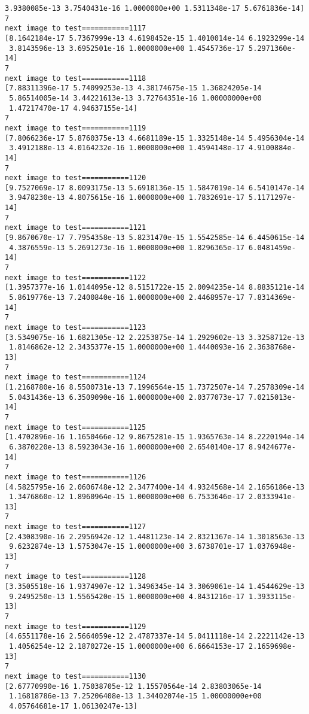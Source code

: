 \documentclass[11pt]{article}
\begin{document}
\begin{Verbatim}[commandchars=\\\{\}]
 3.9380085e-13 3.7540431e-16 1.0000000e+00 1.5311348e-17 5.6761836e-14]
7
next image to test===========1117
[8.1642184e-17 5.7367999e-13 4.6198452e-15 1.4010014e-14 6.1923299e-14
 3.8143596e-13 3.6952501e-16 1.0000000e+00 1.4545736e-17 5.2971360e-14]
7
next image to test===========1118
[7.88311396e-17 5.74099253e-13 4.38174675e-15 1.36824205e-14
 5.86514005e-14 3.44221613e-13 3.72764351e-16 1.00000000e+00
 1.47217470e-17 4.94637155e-14]
7
next image to test===========1119
[7.8066236e-17 5.8760375e-13 4.6681189e-15 1.3325148e-14 5.4956304e-14
 3.4912188e-13 4.0164232e-16 1.0000000e+00 1.4594148e-17 4.9100884e-14]
7
next image to test===========1120
[9.7527069e-17 8.0093175e-13 5.6918136e-15 1.5847019e-14 6.5410147e-14
 3.9478230e-13 4.8075615e-16 1.0000000e+00 1.7832691e-17 5.1171297e-14]
7
next image to test===========1121
[9.8670670e-17 7.7954358e-13 5.8231470e-15 1.5542585e-14 6.4450615e-14
 4.3876559e-13 5.2691273e-16 1.0000000e+00 1.8296365e-17 6.0481459e-14]
7
next image to test===========1122
[1.3957377e-16 1.0144095e-12 8.5151722e-15 2.0094235e-14 8.8835121e-14
 5.8619776e-13 7.2400840e-16 1.0000000e+00 2.4468957e-17 7.8314369e-14]
7
next image to test===========1123
[3.5349075e-16 1.6821305e-12 2.2253875e-14 1.2929602e-13 3.3258712e-13
 1.8146862e-12 2.3435377e-15 1.0000000e+00 1.4440093e-16 2.3638768e-13]
7
next image to test===========1124
[1.2168780e-16 8.5500731e-13 7.1996564e-15 1.7372507e-14 7.2578309e-14
 5.0431436e-13 6.3509090e-16 1.0000000e+00 2.0377073e-17 7.0215013e-14]
7
next image to test===========1125
[1.4702896e-16 1.1650466e-12 9.8675281e-15 1.9365763e-14 8.2220194e-14
 6.3870220e-13 8.5923043e-16 1.0000000e+00 2.6540140e-17 8.9424677e-14]
7
next image to test===========1126
[4.5825795e-16 2.0606748e-12 2.3477400e-14 4.9324568e-14 2.1656186e-13
 1.3476860e-12 1.8960964e-15 1.0000000e+00 6.7533646e-17 2.0333941e-13]
7
next image to test===========1127
[2.4308390e-16 2.2956942e-12 1.4481123e-14 2.8321367e-14 1.3018563e-13
 9.6232874e-13 1.5753047e-15 1.0000000e+00 3.6738701e-17 1.0376948e-13]
7
next image to test===========1128
[3.3505518e-16 1.9374907e-12 1.3496345e-14 3.3069061e-14 1.4544629e-13
 9.2495250e-13 1.5565420e-15 1.0000000e+00 4.8431216e-17 1.3933115e-13]
7
next image to test===========1129
[4.6551178e-16 2.5664059e-12 2.4787337e-14 5.0411118e-14 2.2221142e-13
 1.4056254e-12 2.1870272e-15 1.0000000e+00 6.6664153e-17 2.1659698e-13]
7
next image to test===========1130
[2.67770990e-16 1.75038705e-12 1.15570564e-14 2.83803065e-14
 1.16818786e-13 7.25206408e-13 1.34402074e-15 1.00000000e+00
 4.05764681e-17 1.06130247e-13]

\end{Verbatim}
\end{document}
